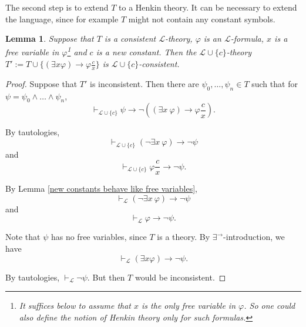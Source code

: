 \documentclass[a4paper, 11pt]{amsart}
\newtheorem{lemma}[lemma]{Lemma}
\theoremstyle{remark}
\newcommand{\cL}{\mathcal L}
\begin{document}
The second step is to extend $T$ to a Henkin theory. 
It can be necessary to extend the language, since for example $T$ might not contain any constant symbols. 

\begin{lemma} 
\label{extending a theory by a witness} 
Suppose that $T$ is a consistent 
$\cL$-theory, $\varphi$ is an $\cL$-formula, $x$ is a free variable in $\varphi$\footnote{It suffices below to assume that $x$ is the only free variable in $\varphi$. So one could also define the notion of Henkin theory only for such formulas. } 
and $c$ is a new constant. 
Then the $\cL\cup \{c\}$-theory $T':= T\cup \{ (\exists x \varphi) \rightarrow \varphi \frac{c}{x} \}$ is $\cL\cup \{c\}$-consistent. 
\end{lemma} 
\begin{proof} 
Suppose that $T'$ is inconsistent. 
Then there are $\psi_0,\dots,\psi_n\in T$ such that for $\psi=\psi_0\wedge \dots \wedge \psi_n$, 
$$\vdash_{\cL\cup\{c\}} \psi \rightarrow \neg((\exists x\ \varphi) \rightarrow \varphi \frac{c}{x}) .$$ 

By tautologies,  
$$\vdash_{\cL\cup\{c\}} (\neg \exists x\ \varphi) \rightarrow \neg \psi $$ 
and 
$$\vdash_{\cL\cup\{c\}} \varphi \frac{c}{x} \rightarrow \neg \psi .$$ 

By Lemma \ref{new constants behave like free variables}, 
$$\vdash_\cL (\neg \exists x\ \varphi) \rightarrow \neg \psi $$ 
and 
$$\vdash_\cL \varphi \rightarrow \neg \psi .$$ 

Note that $\psi$ has no free variables, since $T$ is a theory. 
By $\exists^{\rightarrow}$-introduction, we have 
$$\vdash_\cL (\exists x \varphi) \rightarrow \neg \psi .$$ 

By tautologies,  $\vdash_\cL \neg \psi$. 
But then $T$ would be inconsistent. 
\end{proof} 





\end{document}
